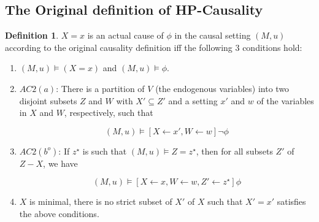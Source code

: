 \documentclass{article}
\theoremstyle{plain}
\theoremstyle{definition}
\newtheorem{defn}[thm]{Definition} %
\begin{document}
\subsection{The Original definition of HP-Causality}
\begin{defn}$X=x$ is an actual cause of $\phi$ in the causal setting $(M,u)$ according to the original causality definition iff the following 3 conditions hold:
\begin{enumerate}
\item $(M,u) \models (X=x)$ and $(M,u) \models \phi$.
\item $AC2(a)$: There is a partition of $V$ (the endogenous variables) into two disjoint subsets $Z$ and $W$ with $X'\subseteq Z'$ and a setting $x'$ and $w$ of the variables in $X$ and $W$, respectively, such that

\[
(M,u) \models [X\leftarrow x', W\leftarrow w]\lnot \phi
\] 

\item $AC2(b^o)$: If $z^\star$ is such that $(M,u)\models Z = z^\star$, then for all subsets $Z'$ of $Z-X$, we have

\[
(M,u) \models [X\leftarrow x, W \leftarrow w, Z' \leftarrow z^\star]\phi
\] 

\item $X$ is minimal, there is no strict subset of $X'$ of $X$ such that $X' = x'$ satisfies the above conditions.
\end{enumerate}

\end{defn}
\end{document}
